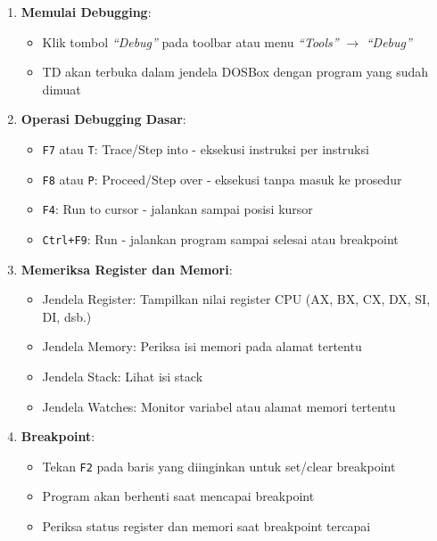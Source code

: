 \documentclass[../main.tex]{subfiles}
\begin{document}
\begin{enumerate}
    \item \textbf{Memulai Debugging}:
    \begin{itemize}
        \item Klik tombol \textit{``Debug''} pada toolbar atau menu \textit{``Tools''} $\rightarrow$ \textit{``Debug''}
        \item TD akan terbuka dalam jendela DOSBox dengan program yang sudah dimuat
    \end{itemize}
    
    \item \textbf{Operasi Debugging Dasar}:
    \begin{itemize}
        \item \texttt{F7} atau \texttt{T}: Trace/Step into - eksekusi instruksi per instruksi
        \item \texttt{F8} atau \texttt{P}: Proceed/Step over - eksekusi tanpa masuk ke prosedur
        \item \texttt{F4}: Run to cursor - jalankan sampai posisi kursor
        \item \texttt{Ctrl+F9}: Run - jalankan program sampai selesai atau breakpoint
    \end{itemize}
    
    \item \textbf{Memeriksa Register dan Memori}:
    \begin{itemize}
        \item Jendela Register: Tampilkan nilai register CPU (AX, BX, CX, DX, SI, DI, dsb.)
        \item Jendela Memory: Periksa isi memori pada alamat tertentu
        \item Jendela Stack: Lihat isi stack
        \item Jendela Watches: Monitor variabel atau alamat memori tertentu
    \end{itemize}
    
    \item \textbf{Breakpoint}:
    \begin{itemize}
        \item Tekan \texttt{F2} pada baris yang diinginkan untuk set/clear breakpoint
        \item Program akan berhenti saat mencapai breakpoint
        \item Periksa status register dan memori saat breakpoint tercapai
    \end{itemize}
\end{enumerate}
\end{document}
